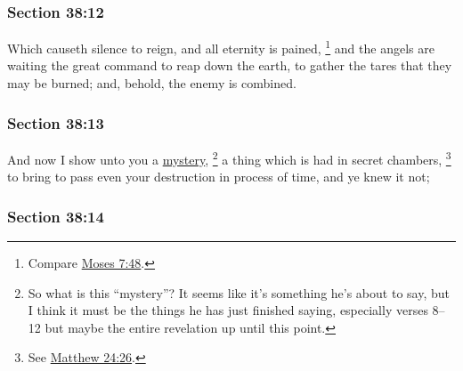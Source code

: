 	\subsubsection{Section 38:12} %
		\label{DC38-12}

		Which causeth silence to reign, and all eternity is pained,%
			\footnote{%
				Compare \hyperref[MOSES-7-48]{Moses 7:48}.
				}
		and the angels are waiting the great command to reap down the earth, to gather the tares that they may be burned; and, behold, the enemy is combined.


	\subsubsection{Section 38:13} %
		\label{DC38-13}

		And now I show unto you a \hyperref[MYSTERY]{mystery},%
			\footnote{%
				So what is this ``mystery''? It seems like it's something he's about to say, but I think it must be the things he has just finished saying, especially verses 8--12 but maybe the entire revelation up until this point.
				}
		a thing which is had in secret chambers,%
			\footnote{%
				See \hyperref[MATTHEW-24-26]{Matthew 24:26}.
				}
		to bring to pass even your destruction in process of time, and ye knew it not;


	\subsubsection{Section 38:14} %
		\label{DC38-14}

